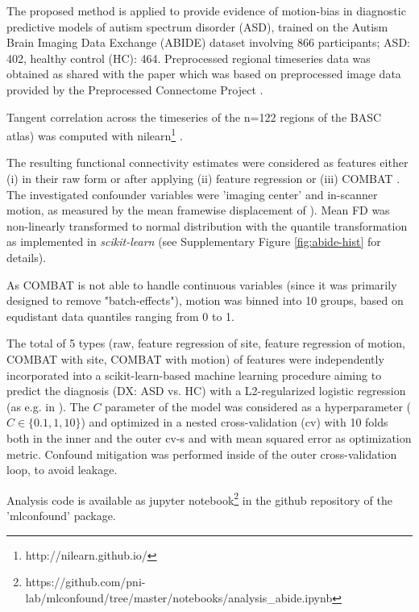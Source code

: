 \documentclass{article}
\begin{document}
The proposed method is applied to provide evidence of motion-bias in diagnostic predictive models of autism spectrum disorder (ASD), trained on the Autism Brain Imaging Data Exchange (ABIDE) dataset \citep{di2014autism} involving 866 participants; ASD: 402, healthy control (HC): 464. Preprocessed regional timeseries data was obtained as shared with the paper \citep{dadi2019benchmarking} which was based on preprocessed image data provided by the Preprocessed Connectome Project \citep{craddock2013neuro}.

Tangent correlation across the timeseries of the n=122 regions of the BASC \citep{bellec2010multi} atlas) was computed with nilearn\footnote{http://nilearn.github.io/} \citep{huntenburg2017loading, esteve2015big}. 

The resulting functional connectivity estimates were considered as features either (i) in their raw form or after applying (ii) feature regression \citep{rao2017predictive} or (iii) COMBAT \citep{johnson2007adjusting, fortin2018harmonization}.
The investigated confounder variables were 'imaging center' and in-scanner motion, as measured by the mean framewise displacement of \cite{power2014methods}).
Mean FD was non-linearly transformed to normal distribution with the quantile transformation \citep{beasley2009rank} as implemented in \emph{scikit-learn} \citep{pedregosa2011scikit} (see Supplementary Figure \ref{fig:abide-hist} for details).

As COMBAT is not able to handle continuous variables (since it was primarily designed to remove "batch-effects"), motion was binned into 10 groups, based on equdistant data quantiles ranging from 0 to 1.

The total of 5 types (raw, feature regression of site, feature regression of motion, COMBAT with site, COMBAT with motion) of features were independently incorporated into a scikit-learn-based \citep{pedregosa2011scikit} machine learning procedure aiming to predict the diagnosis (DX: ASD vs. HC) with a L2-regularized logistic regression (as e.g. in \citep{dadi2019benchmarking}). The $C$ parameter of the model was considered as a hyperparameter ($C \in \{0.1, 1, 10\}$) and optimized in a nested cross-validation (cv) with 10 folds both in the inner and the outer cv-s and with mean squared error as optimization metric. Confound mitigation was performed inside of the outer cross-validation loop, to avoid leakage.

Analysis code is available as jupyter notebook\footnote{https://github.com/pni-lab/mlconfound/tree/master/notebooks/analysis\_abide.ipynb} in the github repository of the 'mlconfound' package.
\end{document}
